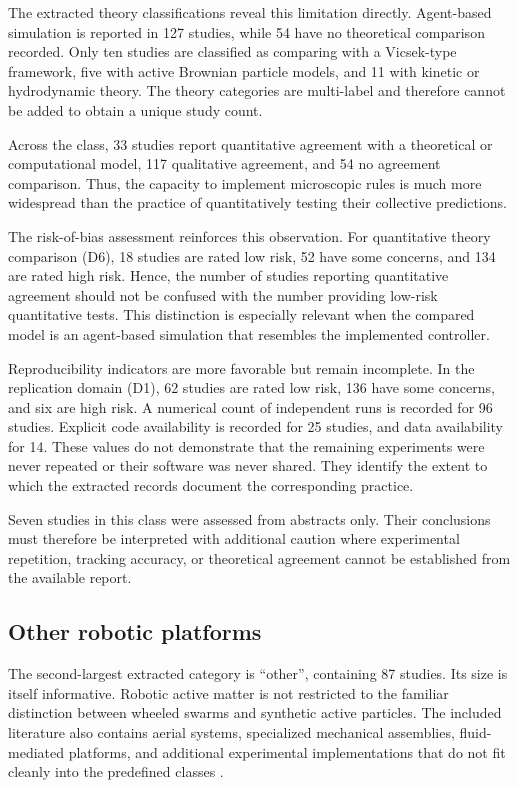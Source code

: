 The extracted theory classifications reveal
this limitation directly. Agent-based simulation
is reported in 127 studies, while 54 have
no theoretical comparison recorded. Only ten
studies are classified as comparing with a
Vicsek-type framework, five with active
Brownian particle models, and 11 with kinetic
or hydrodynamic theory. The theory categories
are multi-label and therefore cannot be
added to obtain a unique study count.

Across the class, 33 studies report quantitative
agreement with a theoretical or computational
model, 117 qualitative agreement, and 54 no
agreement comparison. Thus, the capacity to
implement microscopic rules is much more
widespread than the practice of quantitatively
testing their collective predictions.

The risk-of-bias assessment reinforces this
observation. For quantitative theory comparison
(D6), 18 studies are rated low risk,
52 have some concerns, and 134 are rated
high risk. Hence, the number of studies
reporting quantitative agreement should not
be confused with the number providing
low-risk quantitative tests. This distinction
is especially relevant when the compared
model is an agent-based simulation that
resembles the implemented controller.

Reproducibility indicators are more favorable
but remain incomplete. In the replication
domain (D1), 62 studies are rated low risk,
136 have some concerns, and six are high risk.
A numerical count of independent runs is
recorded for 96 studies. Explicit code
availability is recorded for 25 studies,
and data availability for 14. These values
do not demonstrate that the remaining
experiments were never repeated or their
software was never shared. They identify
the extent to which the extracted records
document the corresponding practice.

Seven studies in this class were assessed
from abstracts only. Their conclusions must
therefore be interpreted with additional
caution where experimental repetition,
tracking accuracy, or theoretical agreement
cannot be established from the available
report.

\subsection{Other robotic platforms}
\label{sec:platforms-other}

The second-largest extracted category is
``other'', containing 87 studies. Its size
is itself informative. Robotic active
matter is not restricted to the familiar
distinction between wheeled swarms and
synthetic active particles. The included
literature also contains aerial systems,
specialized mechanical assemblies,
fluid-mediated platforms, and additional
experimental implementations that do not
fit cleanly into the predefined classes
\cite{Zhou2021synchronizedswimmin,Gravish2023coordinatedcollecti,Li2024memoryinducedspont,Lin2024decodingfrequencies,Zion2024amechanicalorigin,Schilling2019learningvisionbase,Brandsttter2022multiagentspatial,Beaver2022aconstraintdriven,Newbolt2019flowinteractionsbe,Newbolt2024flowinteractionsle,Zhou2022lateralcontactyiel,Fu2023tabletopplatformo}.

